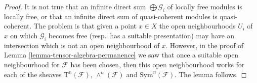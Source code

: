 \begin{proof}
It is not true that an infinite direct sum $\bigoplus \mathcal{G}_i$ of
locally free modules is locally free, or that an
infinite direct sum of quasi-coherent modules
is quasi-coherent. The problem is that given a
point $x \in X$ the open neighbourhoods $U_i$ of $x$ on which $\mathcal{G}_i$
becomes free (resp.\ has a suitable presentation) may have an intersection
which is not an open neighbourhood of $x$. However, in the
proof of Lemma \ref{lemma-tensor-algebra-permanence} we saw that
once a suitable open neighbourhood for $\mathcal{F}$ has been chosen,
then this open neighbourhood works for each of the sheaves
$\text{T}^n(\mathcal{F})$, $\wedge^n(\mathcal{F})$ and
$\text{Sym}^n(\mathcal{F})$.
The lemma follows.
\end{proof}







